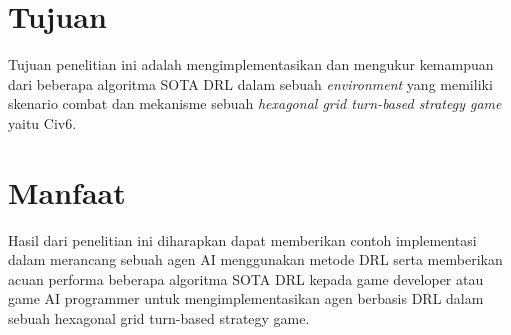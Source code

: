 \section{Tujuan}
\label{sec:Tujuan}

Tujuan penelitian ini adalah mengimplementasikan dan mengukur kemampuan dari beberapa 
algoritma SOTA DRL dalam sebuah \emph{environment} yang memiliki skenario combat dan mekanisme
sebuah \emph{hexagonal grid turn-based strategy game} yaitu Civ6.

\section{Manfaat}
\label{sec:manfaat}

Hasil dari penelitian ini diharapkan dapat memberikan contoh implementasi dalam merancang 
sebuah agen AI menggunakan metode DRL serta memberikan acuan performa beberapa algoritma SOTA DRL kepada game developer atau game AI programmer untuk 
mengimplementasikan agen berbasis DRL dalam sebuah hexagonal grid turn-based strategy game.
